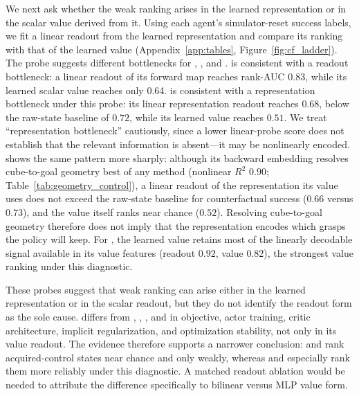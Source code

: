 We next ask whether the weak ranking arises in the learned representation or in the scalar value derived from it.
Using each agent's simulator-reset success labels, we fit a linear readout from the learned representation and compare its ranking with that of the learned value (Appendix~\ref{app:tables}, Figure~\ref{fig:cf_ladder}).
The probe suggests different bottlenecks for \fb{}, \rldp{}, and \psm{}.
\fb{} is consistent with a readout bottleneck: a linear readout of its forward map reaches rank-AUC 0.83, while its learned scalar value reaches only 0.64.
\rldp{} is consistent with a representation bottleneck under this probe: its linear representation readout reaches $0.68$, below the raw-state baseline of $0.72$, while its learned value reaches $0.51$.
We treat ``representation bottleneck'' cautiously, since a lower linear-probe score does not establish that the relevant information is absent---it may be nonlinearly encoded.
\psm{} shows the same pattern more sharply: although its backward embedding resolves cube-to-goal geometry best of any method (nonlinear $R^2$ $0.90$; Table~\ref{tab:geometry_control}), a linear readout of the representation its value uses does not exceed the raw-state baseline for counterfactual success ($0.66$ versus $0.73$), and the value itself ranks near chance ($0.52$). Resolving cube-to-goal geometry therefore does not imply that the representation encodes which grasps the policy will keep.
For \gciql{}, the learned value retains most of the linearly decodable signal available in its value features (readout $0.92$, value $0.82$), the strongest value ranking under this diagnostic.

These probes suggest that weak ranking can arise either in the learned representation or in the scalar readout, but they do not identify the readout form as the sole cause.
\gciql{} differs from \fb{}, \crl{}, \rldp{}, and \psm{} in objective, actor training, critic architecture, implicit regularization, and optimization stability, not only in its value readout.
The evidence therefore supports a narrower conclusion: \rldp{} and \psm{} rank acquired-control states near chance and \fb{} only weakly, whereas \crl{} and especially \gciql{} rank them more reliably under this diagnostic.
A matched readout ablation would be needed to attribute the difference specifically to bilinear versus MLP value form.

